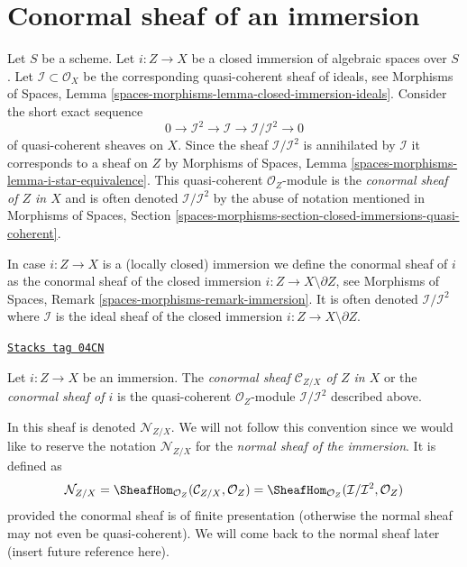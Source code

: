 \section{Conormal sheaf of an immersion}
\label{spaces-more-morphisms-section-conormal-sheaf}
Let $S$ be a scheme. Let $i : Z \to X$ be a closed immersion of algebraic
spaces over $S$. Let $\mathcal{I} \subset \mathcal{O}_X$ be the corresponding
quasi-coherent sheaf of ideals, see
Morphisms of Spaces,
Lemma \ref{spaces-morphisms-lemma-closed-immersion-ideals}.
Consider the short exact sequence
$$
0 \to \mathcal{I}^2 \to \mathcal{I} \to \mathcal{I}/\mathcal{I}^2 \to 0
$$
of quasi-coherent sheaves on $X$. Since the sheaf $\mathcal{I}/\mathcal{I}^2$
is annihilated by $\mathcal{I}$ it corresponds to a sheaf on $Z$ by
Morphisms of Spaces, Lemma \ref{spaces-morphisms-lemma-i-star-equivalence}.
This quasi-coherent $\mathcal{O}_Z$-module is the
{\it conormal sheaf of $Z$ in $X$} and is often denoted
$\mathcal{I}/\mathcal{I}^2$ by the abuse of notation mentioned in
Morphisms of Spaces,
Section \ref{spaces-morphisms-section-closed-immersions-quasi-coherent}.

\medskip\noindent
In case $i : Z \to X$ is a (locally closed) immersion we define the
conormal sheaf of $i$ as the conormal sheaf of the closed
immersion $i : Z \to X \setminus \partial Z$, see
Morphisms of Spaces, Remark \ref{spaces-morphisms-remark-immersion}.
It is often denoted
$\mathcal{I}/\mathcal{I}^2$ where $\mathcal{I}$ is the ideal sheaf
of the closed immersion $i : Z \to X \setminus \partial Z$.

\begin{definition}
\label{spaces-more-morphisms-definition-conormal-sheaf}
\href{https://stacks.math.columbia.edu/tag/04CN}{\texttt{Stacks tag 04CN}}

Let $i : Z \to X$ be an immersion. The {\it conormal sheaf
$\mathcal{C}_{Z/X}$ of $Z$ in $X$} or the {\it conormal sheaf of $i$}
is the quasi-coherent $\mathcal{O}_Z$-module $\mathcal{I}/\mathcal{I}^2$
described above.
\end{definition}

In \cite[IV Definition 16.1.2]{EGA} this sheaf is denoted
$\mathcal{N}_{Z/X}$. We will not follow this convention since we would
like to reserve the notation $\mathcal{N}_{Z/X}$
for the {\it normal sheaf of the immersion}. It is defined as
$$
\mathcal{N}_{Z/X} =
\SheafHom_{\mathcal{O}_Z}(\mathcal{C}_{Z/X}, \mathcal{O}_Z) =
\SheafHom_{\mathcal{O}_Z}(\mathcal{I}/\mathcal{I}^2, \mathcal{O}_Z)
$$
provided the conormal sheaf is of finite presentation (otherwise the
normal sheaf may not even be quasi-coherent). We will come back to the
normal sheaf later (insert future reference here).

